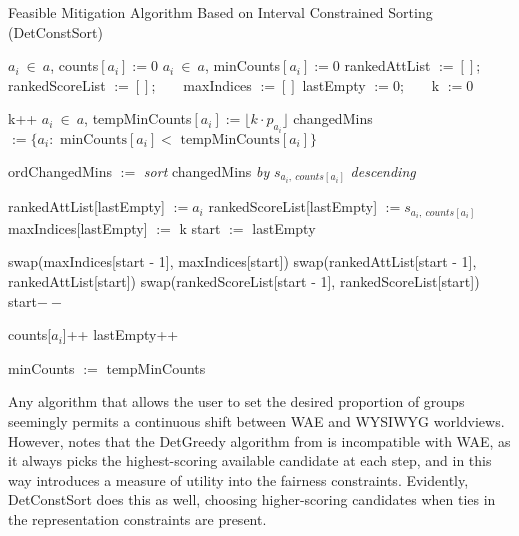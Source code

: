 \begin{algorithm}[h]
\caption{\small{Feasible Mitigation Algorithm Based on Interval Constrained Sorting (DetConstSort)}}
\label{alg:detconstsort}
\small
\begin{algorithmic}[1]

 $a_i ~ \in ~ a$, counts$[a_i] := 0$
 $a_i ~ \in ~ a$, minCounts$[a_i] := 0$
\STATE rankedAttList $:= [ ]$; ~ ~ rankedScoreList $:= [ ]$; ~ ~ maxIndices $:= [ ]$
\STATE lastEmpty $:= 0$; ~ ~ k $:= 0$

	\STATE k++
	 $a_i ~ \in ~ a$, tempMinCounts$[a_i] := \lfloor k \cdot p_{a_i} \rfloor$
	\STATE changedMins $:= \{ a_i: \textrm{ minCounts}[a_i] < \textrm{ tempMinCounts}[a_i] \}$

		\STATE ordChangedMins $:=$ {\em sort} changedMins {\em by} $s_{a_i, ~ counts[a_i]}$ {\em descending}
				
			\STATE rankedAttList[lastEmpty] $:= a_i$
			\STATE rankedScoreList[lastEmpty]  $:= s_{a_i, ~ counts[a_i]}$
			\STATE maxIndices[lastEmpty] $:=$ k
			\STATE start $:=$ lastEmpty

				\STATE swap(maxIndices[start - 1],  maxIndices[start])
				\STATE swap(rankedAttList[start - 1],  rankedAttList[start])
				\STATE swap(rankedScoreList[start - 1],  rankedScoreList[start])
				\STATE start$- -$
			\ENDWHILE
			
			\STATE counts[$a_i$]++
			\STATE lastEmpty++
		\ENDFOR

		\STATE minCounts $:=$ tempMinCounts
	\ENDIF
\ENDWHILE

\end{algorithmic}
\vspace{-1ex}
\end{algorithm}


Any algorithm that allows the user to set the desired proportion of groups seemingly permits a continuous shift between WAE and WYSIWYG worldviews. However, \cite{3533380} notes that the DetGreedy algorithm from \cite{linkedin} is incompatible with WAE, as it always picks the highest-scoring available candidate at each step, and in this way introduces a measure of utility into the fairness constraints. Evidently, DetConstSort does this as well, choosing higher-scoring candidates when ties in the representation constraints are present.


